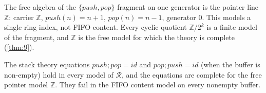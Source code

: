 \begin{remark}
\label{rem:free-ring}
The free algebra of the $\{\mathit{push}, \mathit{pop}\}$ fragment on one
generator is the pointer line $\mathbb{Z}$: carrier
$\mathbb{Z}$, $\mathit{push} (n) = n+1$, $\mathit{pop} (n) = n-1$, generator
$0$. This models a single ring index, not FIFO content. Every cyclic
quotient $\mathbb{Z}/2^{k}$ is a finite model of the fragment, and
$\mathbb{Z}$ is the free model for which the theory is complete
(\autoref{thm:9}).
\end{remark}

\begin{theorem}\label{thm:9}
The stack theory equations $\mathit{push};\mathit{pop} = \mathit{id}$
and $\mathit{pop};\mathit{push} = \mathit{id}$ (when the buffer is
non-empty) hold in every model of $\mathcal{R}$, and the equations are
complete for the free pointer model $\mathbb{Z}$. They fail in the FIFO
content model on every nonempty buffer.
\end{theorem}

